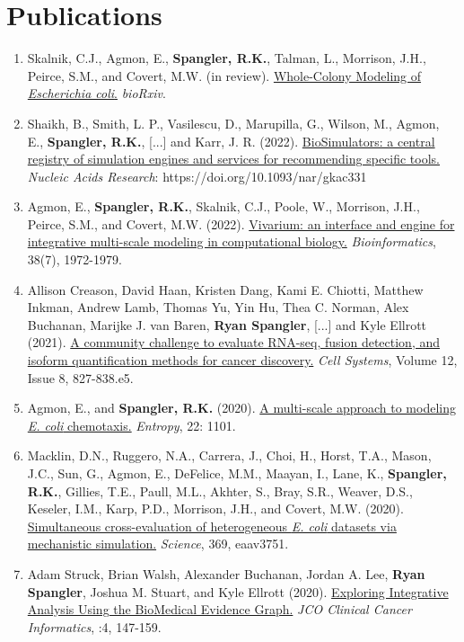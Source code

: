\section{Publications}
\begin{enumerate}%
\item Skalnik, C.J., Agmon, E., \textbf{Spangler, R.K.}, Talman, L., Morrison, J.H., Peirce, S.M., and Covert, M.W. (in review). \href{https://www.biorxiv.org/content/10.1101/2021.04.27.441666v1}{Whole-Colony Modeling of \textit{Escherichia coli}.} \textit{bioRxiv}.
\item Shaikh, B., Smith, L. P., Vasilescu, D., Marupilla, G., Wilson, M., Agmon, E., \textbf{Spangler, R.K.}, [...] and Karr, J. R. (2022). \href{https://doi.org/10.1093/nar/gkac331}{BioSimulators: a central registry of simulation engines and services for recommending specific tools.} \textit{Nucleic Acids Research}: https://doi.org/10.1093/nar/gkac331
\item Agmon, E., \textbf{Spangler, R.K.}, Skalnik, C.J., Poole, W., Morrison, J.H., Peirce, S.M., and Covert, M.W. (2022). \href{https://academic.oup.com/bioinformatics/advance-article-abstract/doi/10.1093/bioinformatics/btac049/6522109}{Vivarium: an interface and engine for integrative multi-scale modeling in computational biology.} \textit{Bioinformatics}, 38(7), 1972-1979.
\item Allison Creason, David Haan, Kristen Dang, Kami E. Chiotti, Matthew Inkman, Andrew Lamb, Thomas Yu, Yin Hu, Thea C. Norman, Alex Buchanan, Marijke J. van Baren, \textbf{Ryan Spangler}, [...] and Kyle Ellrott (2021). \href{https://www.sciencedirect.com/science/article/pii/S2405471221002076}{A community challenge to evaluate RNA-seq, fusion detection, and isoform quantification methods for cancer discovery.} \textit{Cell Systems}, Volume 12, Issue 8, 827-838.e5. 
\item Agmon, E., and \textbf{Spangler, R.K.} (2020). \href{https://www.mdpi.com/1099-4300/22/10/1101}{A multi-scale approach to modeling \textit{E. coli} chemotaxis.} \textit{Entropy}, 22: 1101.
\item Macklin, D.N., Ruggero, N.A., Carrera, J., Choi, H., Horst, T.A., Mason, J.C., Sun, G., Agmon, E., DeFelice, M.M., Maayan, I., Lane, K., \textbf{Spangler, R.K.}, Gillies, T.E., Paull, M.L., Akhter, S., Bray, S.R., Weaver, D.S., Keseler, I.M., Karp, P.D., Morrison, J.H., and Covert, M.W. (2020). \href{https://science.sciencemag.org/content/369/6502/eaav3751.abstract}{Simultaneous cross-evaluation of heterogeneous \textit{E. coli} datasets via mechanistic simulation.} \textit{Science}, 369, eaav3751.
\item Adam Struck, Brian Walsh, Alexander Buchanan, Jordan A. Lee, \textbf{Ryan Spangler}, Joshua M. Stuart, and Kyle Ellrott (2020). \href{https://ascopubs.org/doi/full/10.1200/CCI.19.00110}{Exploring Integrative Analysis Using the BioMedical Evidence Graph.} \textit{JCO Clinical Cancer Informatics}, :4, 147-159.
\end{enumerate}

